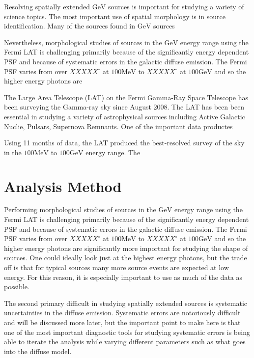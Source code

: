 \documentclass[preprint]{aastex}
\newcommand{\mev}{\text{MeV}\xspace}
\newcommand{\gev}{\text{GeV}\xspace}
\begin{document}
Resolving spatially extended $\gev$ sources is important for studying a
variety of science topics. The most important use of spatial morphology
is in source identification. Many of the sources found in $\gev$ sources

Nevertheless, morphological studies of sources in the $\gev$ energy range using
the Fermi LAT is challenging primarily because of the significantly energy
dependent PSF and because of systematic errors in the
galactic diffuse emission. The Fermi PSF varies from over $XXXXX^\circ$
at $100\mev$ to $XXXXX^\circ$ at $100\gev$ and so the higher energy photons are

The Large Area Telescope (LAT) on the Fermi Gamma-Ray Space Telescope
has been surveying the Gamma-ray sky since August 2008. The LAT has been
been essential in studying a variety of astrophysical sources including
Active Galactic Nuclie, Pulsars, Supernova Remnants. 
One of the important data productes 

Using 11 months of data, the LAT produced the best-resolved survey of the sky
in the $100\mev$ to $100\gev$ energy range\cite{2FGL Paper}. The


\section{Analysis Method}


%

Performing morphological studies of sources in the $\gev$ energy range using
the Fermi LAT is challenging primarily because of the significantly energy
dependent PSF and because of systematic errors in the
galactic diffuse emission. The Fermi PSF varies from over $XXXXX^\circ$
at $100\mev$ to $XXXXX^\circ$ at $100\gev$ and so the higher energy photons are
significantly more important for studying the shape of sources. One could
ideally look just at the highest energy photons, but the trade off is that
for typical sources many more source events are expected at low energy.
For this reason, it is especially important to use as much of the data
as possible.

The second primary difficult in studying spatially extended sources is
systematic uncertainties in the diffuse emission. Systematic errors are
notoriously difficult and will be discussed more later, but the important
point to make here is that one of the most important diagnostic tools for
studying systematic errors is being able to iterate the analysis while
varying different parameters such as what goes into the diffuse model.
\end{document}
